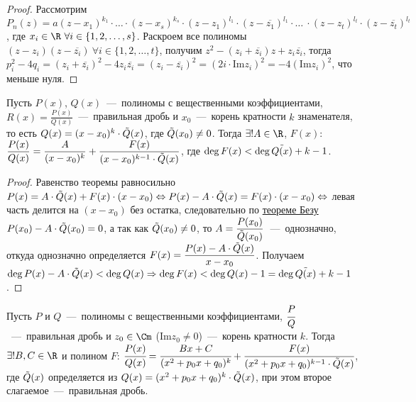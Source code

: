 \begin{proof}
    Рассмотрим $P_{n} (z) = a (z - x_{1})^{k_{1}} \cdot \ldots \cdot (z - x_{s})^{k_{s}} \cdot (z - z_{1})^{l_{1}} \cdot (z - \overline{z_{1}})^{l_{1}} \cdot \ldots \ \cdot (z - z_{t})^{l_{t}} \cdot (z - \overline{z_{t}})^{l_{t}}$, где $x_{i} \in \R \  \forall i \in \{ 1, 2, \ldots, s \}$. Раскроем все полиномы $(z - z_{i}) (z - \overline{z_{i}}) \  \forall i \in \{ 1, 2, \ldots, t\}$, получим $z^{2} - (z_{i} + \overline{z_{i}}) z + z_{i} \overline{z_{i}}$, тогда $p^{2}_{i} - 4 q_{i} = (z_{i} + \overline{z_{i}})^{2} - 4 z_{i} \overline{z_{i}} = (z_{i} - \overline{z_{i}})^{2} = (2i \cdot \text{Im}z_{i})^2 = -4 (\text{Im} z_{i})^{2}$, что меньше нуля.
\end{proof}
\begin{theorem}
    \hypertarget{thm6.8}{Пусть $P (x)$, $Q (x)$~---~полиномы с вещественными коэффициентами, $\displaystyle R (x) = \frac{P (x)}{Q (x)}$~---~правильная дробь и $x_{0}$~---~корень кратности $k$ знаменателя, то есть $Q (x) = (x - x_{0})^{k} \cdot \Tilde{Q} (x)$, где $\Tilde{Q} (x_{0}) \neq 0$. Тогда $\exists! A \in \R$, $F (x)$: $\displaystyle \frac{P (x)}{Q (x)} = \frac{A}{(x - x_{0})^{k}} + \frac{F (x)}{(x - x_{0})^{k - 1} \cdot \Tilde{Q} (x)}$, где $\deg{F (x)} < \deg{\Tilde{Q (x)}} + k - 1$.}
\end{theorem}
\begin{proof}
    Равенство теоремы равносильно $\displaystyle P (x) = A \cdot \Tilde{Q} (x) + F (x) \cdot (x - x_{0}) \Leftrightarrow P (x) - A \cdot \Tilde{Q} (x) = F (x) \cdot (x - x_{0}) \Leftrightarrow$ левая часть делится на $(x - x_{0})$ без остатка, следовательно по \hyperlink{thm6.5}{теореме Безу} $P (x_{0}) - A \cdot \Tilde{Q} (x_{0}) = 0$, а так как $\Tilde{Q} (x_{0}) \neq 0$, то $\displaystyle A = \frac{P (x_{0})}{\Tilde{Q} (x_{0})}$~---~однозначно, откуда однозначно определяется $\displaystyle F (x) = \frac{P (x) - A \cdot \Tilde{Q} (x)}{x - x_{0}}$. Получаем $\deg{P (x) - A \cdot \Tilde{Q} (x)} < \deg{Q (x)} \Rightarrow \deg{F (x)} < \deg{Q (x)} - 1 = \deg{\Tilde{Q (x)}} + k - 1$.
\end{proof}
\begin{theorem}
    Пусть $P$ и $Q$~---~полиномы с вещественными коэффициентами, $\cfrac{P}{Q}$~---~правильная дробь и $z_{0} \in \Cm$ ($\text{Im}z_{0} \neq 0$)~---~корень кратности $k$. Тогда $\exists! B, C \in \R$ и полином $F$: $\cfrac{P (x)}{Q (x)} = \cfrac{Bx + C}{(x^{2} + p_{0} x +q_{0})^{k}} + \cfrac{F (x)}{(x^{2} + p_{0} x +q_{0})^{k - 1} \cdot \Tilde{Q} (x)}$, где $\Tilde{Q} (x)$ определяется из $Q (x) = (x^{2} + p_{0} x +q_{0})^{k} \cdot \Tilde{Q} (x)$, при этом второе слагаемое~---~правильная дробь.
\end{theorem}
